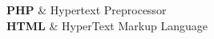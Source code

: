 \begin{abbrList}
\textbf{PHP} & Hypertext Preprocessor \\
\textbf{HTML} & HyperText Markup Language \\
\end{abbrList}